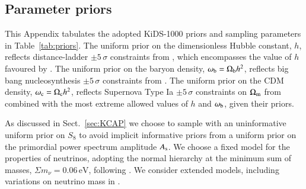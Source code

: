 \begin{appendix}
\section{Parameter priors}
\label{app:priors}
This Appendix tabulates the adopted KiDS-1000 priors and sampling parameters in Table~\ref{tab:priors}.   
The uniform prior on the dimensionless Hubble constant, $h$, reflects distance-ladder $\pm 5\,\sigma$ constraints from \citet{riess/etal:2016}, which encompasses the value of $h$ favoured by \citet{planck/etal:2018}.  
The uniform prior on the baryon density, $\omega_{\rm b}= \Omega_{\rm b}h^2$, reflects big bang nucleosynthesis $\pm 5\, \sigma$ constraints from \citet{olive/etal:2014}.   
The uniform prior on the CDM density, $\omega_{\rm c} = \Omega_{\rm c}h^2$, reflects Supernova Type Ia $\pm 5\, \sigma$ constraints on $\Omega_{\rm m}$ from \citet{scolnic/etal:2018} combined with the most extreme allowed values of $h$ and $\omega_{\rm b}$, given their priors.   

As discussed in Sect.~\ref{sec:KCAP} we choose to sample with an uninformative uniform prior on $S_8$ to avoid implicit informative priors from a uniform prior on the primordial power spectrum amplitude $A_{\rm s}$.    
We choose a fixed model for the properties of neutrinos, adopting the normal hierarchy at the minimum sum of masses, $\Sigma m_\nu = 0.06\,\mathrm{eV}$, following \citet{planck/etal:2018}.  
We consider extended models, including variations on neutrino mass in \citet{troester/etal:inprep}.


\end{appendix}
